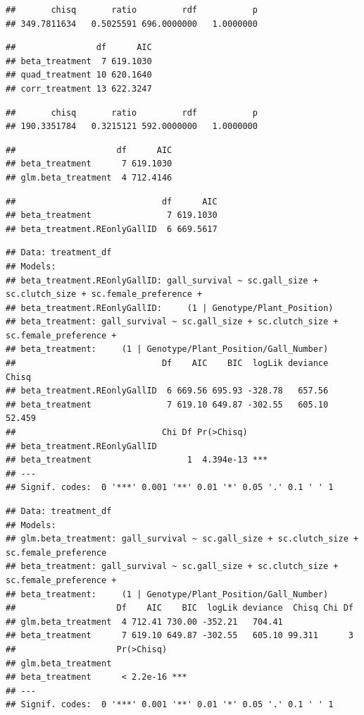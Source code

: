 \documentclass[]{elsarticle} %
\begin{document}
\begin{verbatim}
##       chisq       ratio         rdf           p 
## 349.7811634   0.5025591 696.0000000   1.0000000
\end{verbatim}

\begin{verbatim}
##                df      AIC
## beta_treatment  7 619.1030
## quad_treatment 10 620.1640
## corr_treatment 13 622.3247
\end{verbatim}

\begin{verbatim}
##       chisq       ratio         rdf           p 
## 190.3351784   0.3215121 592.0000000   1.0000000
\end{verbatim}

\begin{verbatim}
##                    df      AIC
## beta_treatment      7 619.1030
## glm.beta_treatment  4 712.4146
\end{verbatim}

\begin{verbatim}
##                             df      AIC
## beta_treatment               7 619.1030
## beta_treatment.REonlyGallID  6 669.5617
\end{verbatim}

\begin{verbatim}
## Data: treatment_df
## Models:
## beta_treatment.REonlyGallID: gall_survival ~ sc.gall_size + sc.clutch_size + sc.female_preference + 
## beta_treatment.REonlyGallID:     (1 | Genotype/Plant_Position)
## beta_treatment: gall_survival ~ sc.gall_size + sc.clutch_size + sc.female_preference + 
## beta_treatment:     (1 | Genotype/Plant_Position/Gall_Number)
##                             Df    AIC    BIC  logLik deviance  Chisq
## beta_treatment.REonlyGallID  6 669.56 695.93 -328.78   657.56       
## beta_treatment               7 619.10 649.87 -302.55   605.10 52.459
##                             Chi Df Pr(>Chisq)    
## beta_treatment.REonlyGallID                      
## beta_treatment                   1  4.394e-13 ***
## ---
## Signif. codes:  0 '***' 0.001 '**' 0.01 '*' 0.05 '.' 0.1 ' ' 1
\end{verbatim}

\begin{verbatim}
## Data: treatment_df
## Models:
## glm.beta_treatment: gall_survival ~ sc.gall_size + sc.clutch_size + sc.female_preference
## beta_treatment: gall_survival ~ sc.gall_size + sc.clutch_size + sc.female_preference + 
## beta_treatment:     (1 | Genotype/Plant_Position/Gall_Number)
##                    Df    AIC    BIC  logLik deviance  Chisq Chi Df
## glm.beta_treatment  4 712.41 730.00 -352.21   704.41              
## beta_treatment      7 619.10 649.87 -302.55   605.10 99.311      3
##                    Pr(>Chisq)    
## glm.beta_treatment               
## beta_treatment      < 2.2e-16 ***
## ---
## Signif. codes:  0 '***' 0.001 '**' 0.01 '*' 0.05 '.' 0.1 ' ' 1
\end{verbatim}
\end{document}
